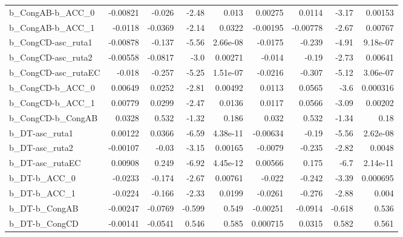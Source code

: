 \begin{tabular}{lrrrrrrrr}
b\_CongAB-b\_ACC\_0      &    -0.00821 &       -0.026 &   -2.48 &    0.013 &    0.00275 &      0.0114 &        -3.17 &       0.00153 \\
b\_CongAB-b\_ACC\_1      &     -0.0118 &      -0.0369 &   -2.14 &   0.0322 &   -0.00195 &    -0.00778 &        -2.67 &       0.00767 \\
b\_CongCD-asc\_ruta1    &    -0.00878 &       -0.137 &   -5.56 & 2.66e-08 &    -0.0175 &      -0.239 &        -4.91 &      9.18e-07 \\
b\_CongCD-asc\_ruta2    &    -0.00558 &      -0.0817 &    -3.0 &  0.00271 &     -0.014 &       -0.19 &        -2.73 &       0.00641 \\
b\_CongCD-asc\_rutaEC   &      -0.018 &       -0.257 &   -5.25 & 1.51e-07 &    -0.0216 &      -0.307 &        -5.12 &      3.06e-07 \\
b\_CongCD-b\_ACC\_0      &     0.00649 &       0.0252 &   -2.81 &  0.00492 &     0.0113 &      0.0565 &         -3.6 &      0.000316 \\
b\_CongCD-b\_ACC\_1      &     0.00779 &       0.0299 &   -2.47 &   0.0136 &     0.0117 &      0.0566 &        -3.09 &       0.00202 \\
b\_CongCD-b\_CongAB     &      0.0328 &        0.532 &   -1.32 &    0.186 &      0.032 &       0.532 &        -1.34 &          0.18 \\
b\_DT-asc\_ruta1        &     0.00122 &       0.0366 &   -6.59 & 4.38e-11 &   -0.00634 &       -0.19 &        -5.56 &      2.62e-08 \\
b\_DT-asc\_ruta2        &    -0.00107 &        -0.03 &   -3.15 &  0.00165 &    -0.0079 &      -0.235 &        -2.82 &        0.0048 \\
b\_DT-asc\_rutaEC       &     0.00908 &        0.249 &   -6.92 & 4.45e-12 &    0.00566 &       0.175 &         -6.7 &      2.14e-11 \\
b\_DT-b\_ACC\_0          &     -0.0233 &       -0.174 &   -2.67 &  0.00761 &     -0.022 &      -0.242 &        -3.39 &      0.000695 \\
b\_DT-b\_ACC\_1          &     -0.0224 &       -0.166 &   -2.33 &   0.0199 &    -0.0261 &      -0.276 &        -2.88 &         0.004 \\
b\_DT-b\_CongAB         &    -0.00247 &      -0.0769 &  -0.599 &    0.549 &   -0.00251 &     -0.0914 &       -0.618 &         0.536 \\
b\_DT-b\_CongCD         &    -0.00141 &      -0.0541 &   0.546 &    0.585 &   0.000715 &      0.0315 &        0.582 &         0.561 \\

\end{tabular}
